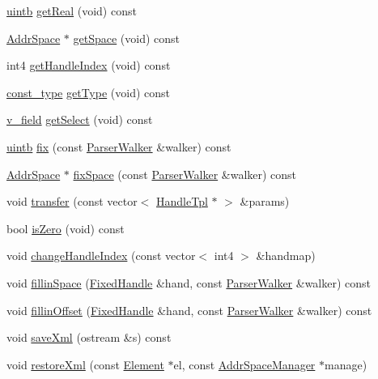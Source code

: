 \begin{DoxyCompactItemize}
\item 
\mbox{\hyperlink{types_8h_a2db313c5d32a12b01d26ac9b3bca178f}{uintb}} \mbox{\hyperlink{class_const_tpl_a456a8ce94fc3beba134ed54c6e2a5773}{get\+Real}} (void) const
\item 
\mbox{\hyperlink{class_addr_space}{Addr\+Space}} $\ast$ \mbox{\hyperlink{class_const_tpl_ab23dfe352075812889649cffec63f80a}{get\+Space}} (void) const
\item 
int4 \mbox{\hyperlink{class_const_tpl_ae13b49fd91f96382b97c7b0d6901653f}{get\+Handle\+Index}} (void) const
\item 
\mbox{\hyperlink{class_const_tpl_af7f677ee5ef2e5af1becb0109793396b}{const\+\_\+type}} \mbox{\hyperlink{class_const_tpl_ac919975d2d1ceff56bc5a0e6961ec04b}{get\+Type}} (void) const
\item 
\mbox{\hyperlink{class_const_tpl_a4aa1b485e0cac884006d1aa35b3b0c57}{v\+\_\+field}} \mbox{\hyperlink{class_const_tpl_a4bc27aa15f85b5fb4a621a7488b9f6fc}{get\+Select}} (void) const
\item 
\mbox{\hyperlink{types_8h_a2db313c5d32a12b01d26ac9b3bca178f}{uintb}} \mbox{\hyperlink{class_const_tpl_a2676416d2a1e9a14443ca54fb8af042d}{fix}} (const \mbox{\hyperlink{class_parser_walker}{Parser\+Walker}} \&walker) const
\item 
\mbox{\hyperlink{class_addr_space}{Addr\+Space}} $\ast$ \mbox{\hyperlink{class_const_tpl_ab27ba4441dc79c4dd00dbd41d75d3e90}{fix\+Space}} (const \mbox{\hyperlink{class_parser_walker}{Parser\+Walker}} \&walker) const
\item 
void \mbox{\hyperlink{class_const_tpl_a71f5d8ca70523ece65f093a1d83ef314}{transfer}} (const vector$<$ \mbox{\hyperlink{class_handle_tpl}{Handle\+Tpl}} $\ast$ $>$ \&params)
\item 
bool \mbox{\hyperlink{class_const_tpl_a544ad1f2c43673e6975da4872003626f}{is\+Zero}} (void) const
\item 
void \mbox{\hyperlink{class_const_tpl_abfd18cee78e9e1aedd8f2e2c42f7c40f}{change\+Handle\+Index}} (const vector$<$ int4 $>$ \&handmap)
\item 
void \mbox{\hyperlink{class_const_tpl_ad04e4bde130998d2083f9befd8472d66}{fillin\+Space}} (\mbox{\hyperlink{struct_fixed_handle}{Fixed\+Handle}} \&hand, const \mbox{\hyperlink{class_parser_walker}{Parser\+Walker}} \&walker) const
\item 
void \mbox{\hyperlink{class_const_tpl_a80f254aea88a52ec15deed96f46d1b97}{fillin\+Offset}} (\mbox{\hyperlink{struct_fixed_handle}{Fixed\+Handle}} \&hand, const \mbox{\hyperlink{class_parser_walker}{Parser\+Walker}} \&walker) const
\item 
void \mbox{\hyperlink{class_const_tpl_ad8fe31f044a44888cbf07b760db54627}{save\+Xml}} (ostream \&s) const
\item 
void \mbox{\hyperlink{class_const_tpl_a693d02a50ed80c1601bb7d6e648c09ec}{restore\+Xml}} (const \mbox{\hyperlink{class_element}{Element}} $\ast$el, const \mbox{\hyperlink{class_addr_space_manager}{Addr\+Space\+Manager}} $\ast$manage)
\end{DoxyCompactItemize}


